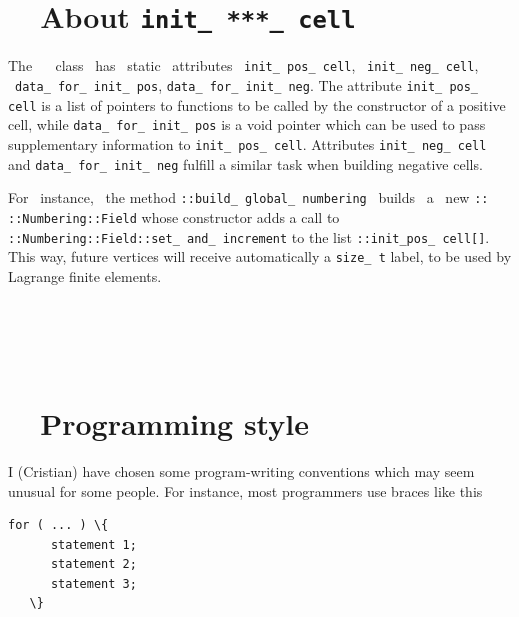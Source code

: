 \section{~~About {\tt init\_\,***\_\,cell}}\label{\numb section 11.\numb parag 10}

The \ {\small\tt{}} \ class \ has \ static \ attributes \ {\small\tt init\_\,pos\_\,cell},
\ {\small\tt init\_\,neg\_\,cell}, \ {\small\tt data\_\,for\_\,init\_\,pos},
{\small\tt data\_\,for\_\,init\_\,neg}.
The attribute {\small\tt init\_\,pos\_\,cell} is a list of pointers to functions to be called by
the constructor of a positive cell, while {\small\tt data\_\,for\_\,init\_\,pos} is a void pointer
which can be used to pass supplementary information to {\small\tt init\_\,pos\_\,cell}.
Attributes {\small\tt init\_\,neg\_\,cell} and {\small\tt data\_\,for\_\,init\_\,neg} fulfill
a similar task when building negative cells.

For \ instance, \ the method {\small\tt{}::build\_\,global\_\,numbering}
\ builds \ a \ new {\small\tt{}:: ::Numbering::Field} whose constructor
adds a call to {\small\tt{}::Numbering::Field::set\_\,and\_\,increment} to
the list {\small\tt{}::init\_\;pos\_\,cell[]}.
This way, future vertices will receive automatically a {\small\tt size\_\,t} label, to be used
by Lagrange finite elements.


\section{~~\cinzasec{[empty]}}\label{\numb section 11.\numb parag 11}


\section{~~Programming style}\label{\numb section 11.\numb parag 12}

I (Cristian) have chosen some program-writing conventions which may seem unusual for some people.
For instance, most programmers use braces like this

\begin{Verbatim}[commandchars=\\\{\},formatcom=\small\tt,baselinestretch=0.94]
   for ( ... ) \{
      statement 1;
      statement 2;
      statement 3;
   \}
\end{Verbatim}

